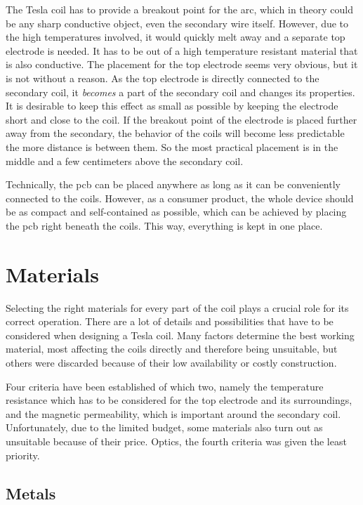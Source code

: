 The Tesla coil has to provide a breakout point for the arc, which in theory could be any sharp conductive object, even the secondary wire itself. However, due to the high temperatures involved, it would quickly melt away and a separate top electrode is needed. It has to be out of a high temperature resistant material that is also conductive. The placement for the top electrode seems very obvious, but it is not without a reason. As the top electrode is directly connected to the secondary coil, it \emph{becomes} a part of the secondary coil and changes its properties. It is desirable to keep this effect as small as possible by keeping the electrode short and close to the coil. If the breakout point of the electrode is placed further away from the secondary, the behavior of the coils will become less predictable the more distance is between them. So the most practical placement is in the middle and a few centimeters above the secondary coil.

Technically, the \gls{pcb} can be placed anywhere as long as it can be conveniently connected to the coils. However, as a consumer product, the whole device should be as compact and self-contained as possible, which can be achieved by placing the \gls{pcb} right beneath the coils. This way, everything is kept in one place. 

\section{Materials}

Selecting the right materials for every part of the coil plays a crucial role for its correct operation. There are a lot of details and possibilities that have to be considered when designing a Tesla coil. Many factors determine the best working material, most affecting the coils directly and therefore being unsuitable, but others were discarded because of their low availability or costly construction. 

Four criteria have been established of which two, namely the temperature resistance which has to be considered for the top electrode and its surroundings, and the magnetic permeability, which is important around the secondary coil. Unfortunately, due to the limited budget, some materials also turn out as unsuitable because of their price. Optics, the fourth criteria was given the least priority.

\subsection{Metals}
\label{subsec:materials-metals}

